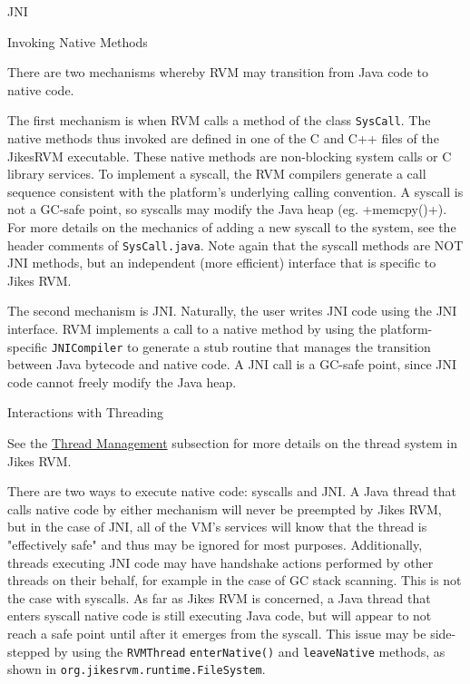 \begin{section}{JNI}
\begin{subsection}{Invoking Native Methods}

There are two mechanisms whereby RVM may transition from Java code to native code.

The first mechanism is when RVM calls a method of the class \texttt{SysCall}. The native methods thus invoked are defined in one of the C and C++ files of the JikesRVM executable. These native methods are non-blocking system calls or C library services. To implement a syscall, the RVM compilers generate a call sequence consistent with the platform's underlying calling convention. A syscall is not a GC-safe point, so syscalls may modify the Java heap (eg. \spverb+memcpy()+). For more details on the mechanics of adding a new syscall to the system, see the header comments of \texttt{Sys\-Call.java}. Note again that the syscall methods are NOT JNI methods, but an independent (more efficient) interface that is specific to Jikes RVM.

The second mechanism is JNI. Naturally, the user writes JNI code using the JNI interface. RVM implements a call to a native method by using the platform-specific \texttt{JNI\-Com\-pi\-ler} to generate a stub routine that manages the transition between Java bytecode and native code. A JNI call is a GC-safe point, since JNI code cannot freely modify the Java heap.

\end{subsection}

\begin{subsection}{Interactions with Threading}

See the \hyperref[sec:threadmanagement]{Thread Management} subsection for more details on the thread system in Jikes RVM.

There are two ways to execute native code: syscalls and JNI. A Java thread that calls native code by either mechanism will never be preempted by Jikes RVM, but in the case of JNI, all of the VM's services will know that the thread is "effectively safe" and thus may be ignored for most purposes. Additionally, threads executing JNI code may have handshake actions performed by other threads on their behalf, for example in the case of GC stack scanning. This is not the case with syscalls. As far as Jikes RVM is concerned, a Java thread that enters syscall native code is still executing Java code, but will appear to not reach a safe point until after it emerges from the syscall. This issue may be side-stepped by using the \texttt{RVM\-Thread} \texttt{en\-ter\-Na\-ti\-ve()} and \texttt{lea\-ve\-Na\-ti\-ve} methods, as shown in \texttt{org.jikes\-rvm.run\-ti\-me.Fi\-le\-Sys\-tem}.


\end{subsection}
\end{section}
